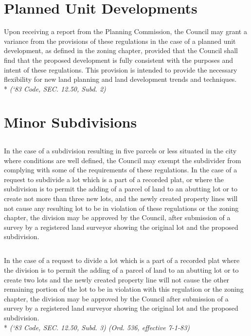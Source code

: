 \section{Planned Unit Developments}
Upon receiving a report from the Planning Commission, the Council may grant a variance from the provisions of these regulations in the case of a planned unit development, as defined in the zoning chapter, provided that the Council shall find that the proposed development is fully consistent with the purposes and intent of these regulations. This provision is intended to provide the necessary flexibility for new land planning and land development trends and techniques.\\*
\emph{(‘83 Code, SEC. 12.50, Subd. 2)}
\section{Minor Subdivisions}
\subsection{}
In the case of a subdivision resulting in five parcels or less situated in the city where conditions are well defined, the Council may exempt the subdivider from complying with some of the requirements of these regulations. In the case of a request to subdivide a lot which is a part of a recorded plat, or where the subdivision is to permit the adding of a parcel of land to an abutting lot or to create not more than three new lots, and the newly created property lines will not cause any resulting lot to be in violation of these regulations or the zoning chapter, the division may be approved by the Council, after submission of a survey by a registered land surveyor showing the original lot and the proposed subdivision.
\subsection{}
In the case of a request to divide a lot which is a part of a recorded plat where the division is to permit the adding of a parcel of land to an abutting lot or to create two lots and the newly created property line will not cause the other remaining portion of the lot to be in violation with this regulation or the zoning chapter, the division may be approved by the Council after submission of a survey by a registered land surveyor showing the original lot and the proposed subdivision.\\*
\emph{(‘83 Code, SEC. 12.50, Subd. 3)  (Ord. 536, effective 7-1-83)}

